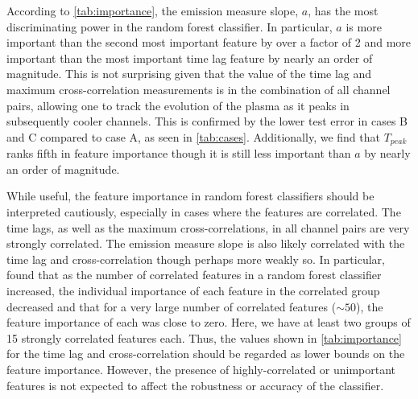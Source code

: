 According to \autoref{tab:importance}, the emission measure slope, $a$, has the most discriminating power in the random forest classifier.
In particular, $a$ is more important than the second most important feature by over a factor of 2 and more important than the most important time lag feature by nearly an order of magnitude.
This is not surprising given that the value of the time lag and maximum cross-correlation measurements is in the combination of all channel pairs, allowing one to track the evolution of the plasma as it peaks in subsequently cooler channels.
This is confirmed by the lower test error in cases B and C compared to case A, as seen in \autoref{tab:cases}.
Additionally, we find that $T_{peak}$ ranks fifth in feature importance though it is still less important than $a$ by nearly an order of magnitude.

While useful, the feature importance in random forest classifiers should be interpreted cautiously, especially in cases where the features are correlated.
The time lags, as well as the maximum cross-correlations, in all channel pairs are very strongly correlated.
The emission measure slope is also likely correlated with the time lag and cross-correlation though perhaps more weakly so.
In particular, \citet{altmann_permutation_2010} found that as the number of correlated features in a random forest classifier increased, the individual importance of each feature in the correlated group decreased and that for a very large number of correlated features ($\sim50$), the feature importance of each was close to zero.
Here, we have at least two groups of 15 strongly correlated features each.
Thus, the values shown in \autoref{tab:importance} for the time lag and cross-correlation should be regarded as lower bounds on the feature importance. 
However, the presence of highly-correlated or unimportant features is not expected to affect the robustness or accuracy of the classifier.
